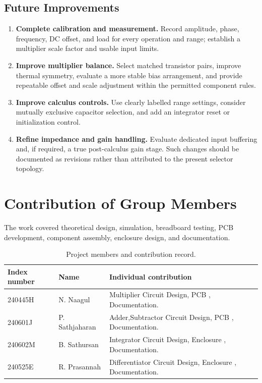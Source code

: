 \documentclass[11pt,a4paper]{article}
\begin{document}
\subsection{Future Improvements}
\begin{enumerate}
\item \textbf{Complete calibration and measurement.} Record amplitude, phase, frequency, DC offset, and load for every operation and range; establish a multiplier scale factor and usable input limits.
\item \textbf{Improve multiplier balance.} Select matched transistor pairs, improve thermal symmetry, evaluate a more stable bias arrangement, and provide repeatable offset and scale adjustment within the permitted component rules.
\item \textbf{Improve calculus controls.} Use clearly labelled range settings, consider mutually exclusive capacitor selection, and add an integrator reset or initialization control.
\item \textbf{Refine impedance and gain handling.} Evaluate dedicated input buffering and, if required, a true post-calculus gain stage. Such changes should be documented as revisions rather than attributed to the present selector topology.
\end{enumerate}

\section{Contribution of Group Members}
The work covered theoretical design, simulation, breadboard testing, PCB development, component assembly, enclosure design, and documentation.
\begin{table}[htbp]
\centering\small
\caption{Project members and contribution record.}
\begin{tabularx}{\textwidth}{llY}
\toprule
\textbf{Index number} & \textbf{Name} & \textbf{Individual contribution}\\
\midrule
240445H & N. Naagul & Multiplier Circuit Design, PCB , Documentation.\\
240601J & P. Sathjaharan & Adder,Subtractor Circuit Design, PCB , Documentation.\\
240602M & B. Sathursan & Integrator Circuit Design, Enclosure , Documentation.\\
240525E & R. Prasannah & Differentiator Circuit Design, Enclosure , Documentation.\\
\bottomrule
\end{tabularx}
\end{table}
\end{document}
